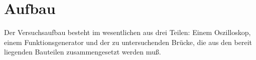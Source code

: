 
\section{Aufbau}

Der Versuchsaufbau besteht im wesentlichen aus drei Teilen: Einem
Oszilloskop, einem Funktionsgenerator und der zu untersuchenden Brücke,
die aus den bereit liegenden Bauteilen zusammengesetzt werden muß.

